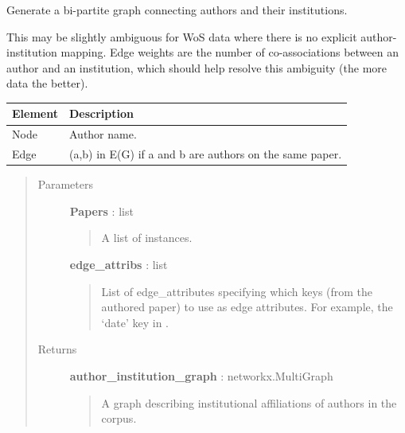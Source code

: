 \documentclass[letterpaper,10pt,english]{sphinxmanual}
\begin{document}
\begin{fulllineitems}
\label{tethne.networks:tethne.networks.authors.author_institution}
Generate a bi-partite graph connecting authors and their institutions.

This may be slightly ambiguous for WoS data where there is no explicit
author-institution mapping. Edge weights are the number of co-associations
between an author and an institution, which should help resolve this
ambiguity (the more data the better).

\begin{tabulary}{\linewidth}{|L|L|}
\hline
\textbf{
Element
} & \textbf{
Description
}\\\hline

Node
 & 
Author name.
\\\hline

Edge
 & 
(a,b) in E(G) if a and b are authors on the same paper.
\\\hline
\end{tabulary}

\begin{quote}\begin{description}
\item[{Parameters }] \leavevmode
\textbf{Papers} : list
\begin{quote}

A list of {\hyperref[tethne:tethne.data.Paper]{}} instances.
\end{quote}

\textbf{edge\_attribs} : list
\begin{quote}

List of edge\_attributes specifying which {\hyperref[tethne:tethne.data.Paper]{}} keys (from the
authored paper) to use as edge attributes. For example, the `date' key
in {\hyperref[tethne:tethne.data.Paper]{}} .
\end{quote}

\item[{Returns }] \leavevmode
\textbf{author\_institution\_graph} : networkx.MultiGraph
\begin{quote}

A graph describing institutional affiliations of authors in the corpus.
\end{quote}

\end{description}\end{quote}

\end{fulllineitems}
\end{document}
